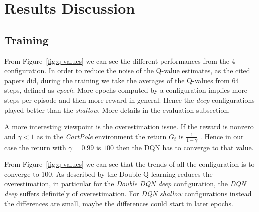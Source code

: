 \section{Results Discussion}

\subsection{Training}


From Figure~\ref{fig:q-values} we can see the different performances from the 4 configuration. In order to reduce the noise of the Q-value estimates, as the cited papers did, during the training we take the averages of the Q-values from 64 steps, defined as \textit{epoch}. More epochs computed by a configuration implies more steps per episode and then more reward in general. Hence the \textit{deep} configurations played better than the \textit{shallow}. More details in the evaluation subsection.

A more interesting viewpoint is the overestimation issue. If the reward is nonzero and $\gamma < 1$ as in the \textit{CartPole} environment the return $G_t$ is $\frac{1}{1 - \gamma}$ \cite{Sutton:1998:IRL:551283}. Hence in our case the return with $\gamma = 0.99$ is $100$ then the DQN has to converge to that value.

From Figure~\ref{fig:q-values} we can see that the trends of all the configuration is to converge to 100. As described by \citeauthor{Hasselt:2016:DRL:3016100.3016191}  the Double Q-learning reduces the overestimation, in particular for the \textit{Double DQN deep} configuration, the \textit{DQN deep} suffers definitely of overestimation. For \textit{DQN shallow} configurations instead the differences are small, maybe the differences could start in later epochs.

